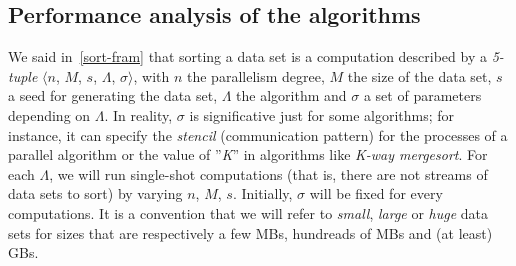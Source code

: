 \subsection{Performance analysis of the algorithms}
\label{performance-analysys}
We said in~\ref{sort-fram} that sorting a data set is a computation described by a \textit{5-tuple} $\langle n$, $M$, $s$, $\Lambda$, $\sigma \rangle$, with $n$ the parallelism degree, $M$ the size of the data set, $s$ a seed for generating the data set, $\Lambda$ the algorithm and $\sigma$ a set of parameters depending on $\Lambda$. In reality, $\sigma$ is significative just for some algorithms; for instance, it can specify the \textit{stencil} (communication pattern) for the processes of a parallel algorithm or the value of ''\textit{K}'' in algorithms like \textit{K-way mergesort}. For each $\Lambda$, we will run single-shot computations (that is, there are not streams of data sets to sort) by varying $n$, $M$, $s$. Initially, $\sigma$ will be fixed for every computations. It is a convention that we will refer to \textit{small}, \textit{large} or \textit{huge} data sets for sizes that are respectively a few MBs, hundreads of MBs and (at least) GBs. 

